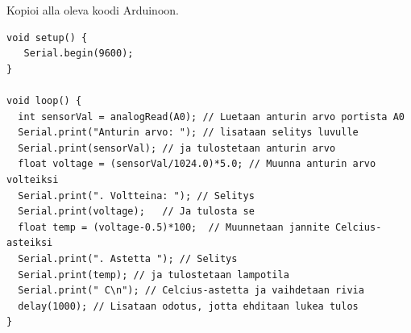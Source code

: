 \begin{figure}[h!]
    \centering
\end{figure}

Kopioi alla oleva koodi Arduinoon.
\begin{lstlisting}[numbers=none,showstringspaces=false] 
void setup() {
   Serial.begin(9600);
}

void loop() {
  int sensorVal = analogRead(A0); // Luetaan anturin arvo portista A0
  Serial.print("Anturin arvo: "); // lisataan selitys luvulle
  Serial.print(sensorVal); // ja tulostetaan anturin arvo
  float voltage = (sensorVal/1024.0)*5.0; // Muunna anturin arvo volteiksi
  Serial.print(". Voltteina: "); // Selitys
  Serial.print(voltage);   // Ja tulosta se
  float temp = (voltage-0.5)*100;  // Muunnetaan jannite Celcius-asteiksi
  Serial.print(". Astetta "); // Selitys
  Serial.print(temp); // ja tulostetaan lampotila
  Serial.print(" C\n"); // Celcius-astetta ja vaihdetaan rivia
  delay(1000); // Lisataan odotus, jotta ehditaan lukea tulos
}
\end{lstlisting}

